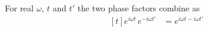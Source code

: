 \documentclass{article}
\begin{document}
For real $\omega$, $t$ and $t'$ the two phase factors combine as
\begin{equation}
\begin{aligned}[t]
e^{i\omega t}\, e^{-i\omega t'} &= e^{i\omega t - i\omega t'}
\end{aligned}
\label{eq:phase}
\end{equation}
\end{document}

